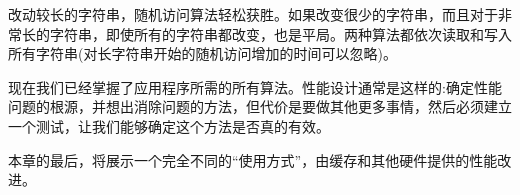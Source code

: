 改动较长的字符串，随机访问算法轻松获胜。如果改变很少的字符串，而且对于非常长的字符串，即使所有的字符串都改变，也是平局。两种算法都依次读取和写入所有字符串(对长字符串开始的随机访问增加的时间可以忽略)。

现在我们已经掌握了应用程序所需的所有算法。性能设计通常是这样的:确定性能问题的根源，并想出消除问题的方法，但代价是要做其他更多事情，然后必须建立一个测试，让我们能够确定这个方法是否真的有效。

本章的最后，将展示一个完全不同的“使用方式”，由缓存和其他硬件提供的性能改进。




























